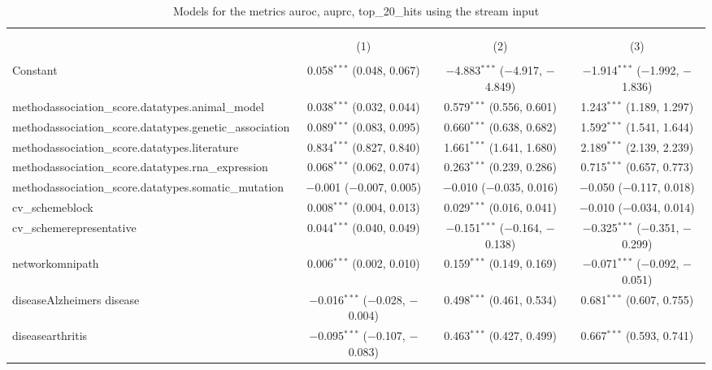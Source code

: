 
\begin{table}[!htbp] \centering 
  \caption{Models for the metrics auroc, auprc, top_20_hits using the stream input} 
  \label{} 
\begin{tabular}{@{\extracolsep{5pt}}lccc} 
\\[-1.8ex]\hline 
\hline \\[-1.8ex] 
\\[-1.8ex] & (1) & (2) & (3)\\ 
\hline \\[-1.8ex] 
 Constant & 0.058$^{***}$ (0.048, 0.067) & $-$4.883$^{***}$ ($-$4.917, $-$4.849) & $-$1.914$^{***}$ ($-$1.992, $-$1.836) \\ 
  methodassociation\_score.datatypes.animal\_model & 0.038$^{***}$ (0.032, 0.044) & 0.579$^{***}$ (0.556, 0.601) & 1.243$^{***}$ (1.189, 1.297) \\ 
  methodassociation\_score.datatypes.genetic\_association & 0.089$^{***}$ (0.083, 0.095) & 0.660$^{***}$ (0.638, 0.682) & 1.592$^{***}$ (1.541, 1.644) \\ 
  methodassociation\_score.datatypes.literature & 0.834$^{***}$ (0.827, 0.840) & 1.661$^{***}$ (1.641, 1.680) & 2.189$^{***}$ (2.139, 2.239) \\ 
  methodassociation\_score.datatypes.rna\_expression & 0.068$^{***}$ (0.062, 0.074) & 0.263$^{***}$ (0.239, 0.286) & 0.715$^{***}$ (0.657, 0.773) \\ 
  methodassociation\_score.datatypes.somatic\_mutation & $-$0.001 ($-$0.007, 0.005) & $-$0.010 ($-$0.035, 0.016) & $-$0.050 ($-$0.117, 0.018) \\ 
  cv\_schemeblock & 0.008$^{***}$ (0.004, 0.013) & 0.029$^{***}$ (0.016, 0.041) & $-$0.010 ($-$0.034, 0.014) \\ 
  cv\_schemerepresentative & 0.044$^{***}$ (0.040, 0.049) & $-$0.151$^{***}$ ($-$0.164, $-$0.138) & $-$0.325$^{***}$ ($-$0.351, $-$0.299) \\ 
  networkomnipath & 0.006$^{***}$ (0.002, 0.010) & 0.159$^{***}$ (0.149, 0.169) & $-$0.071$^{***}$ ($-$0.092, $-$0.051) \\ 
  diseaseAlzheimers disease & $-$0.016$^{***}$ ($-$0.028, $-$0.004) & 0.498$^{***}$ (0.461, 0.534) & 0.681$^{***}$ (0.607, 0.755) \\ 
  diseasearthritis & $-$0.095$^{***}$ ($-$0.107, $-$0.083) & 0.463$^{***}$ (0.427, 0.499) & 0.667$^{***}$ (0.593, 0.741) \\ 

\end{tabular}
\end{table}
